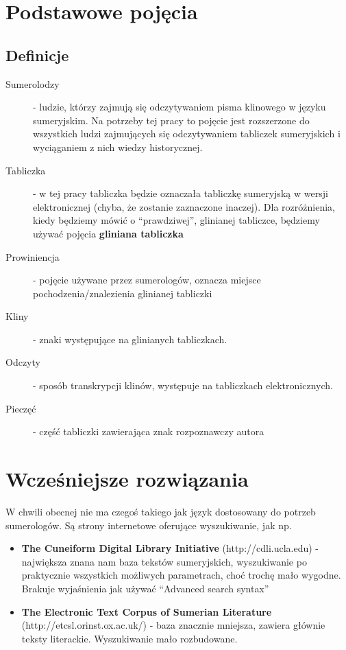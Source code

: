 \documentclass{pracamgr}
\begin{document}
\chapter{Podstawowe pojęcia}\label{r:pojecia}
\section{Definicje}
\begin{description}
 \item[Sumerolodzy] - ludzie, którzy zajmują się odczytywaniem pisma klinowego w języku sumeryjskim. Na potrzeby tej pracy
		      to pojęcie jest rozszerzone do wszystkich ludzi zajmujących się odczytywaniem tabliczek sumeryjskich 
		      i wyciąganiem z nich wiedzy historycznej.
 \item[Tabliczka] - w tej pracy tabliczka będzie oznaczała tabliczkę sumeryjską w wersji elektronicznej 
		  (chyba, że zostanie zaznaczone inaczej). Dla rozróżnienia, kiedy będziemy mówić o ``prawdziwej'', 
		  glinianej tabliczce, będziemy używać pojęcia \textbf{gliniana tabliczka}
 \item[Prowiniencja] - pojęcie używane przez sumerologów, oznacza miejsce pochodzenia/znalezienia glinianej tabliczki
 \item[Kliny] - znaki występujące na glinianych tabliczkach.
 \item[Odczyty] - sposób transkrypcji klinów, występuje na tabliczkach elektronicznych.
 \item[Pieczęć] - część tabliczki zawierająca znak rozpoznawczy autora
\end{description}




\chapter{Wcześniejsze rozwiązania}\label{r:losers}
W chwili obecnej nie ma czegoś takiego jak język dostosowany do potrzeb sumerologów. Są strony internetowe oferujące wyszukiwanie, 
jak np.
\begin{itemize}
\item \textbf{The Cuneiform Digital Library Initiative} (http://cdli.ucla.edu) - największa znana nam baza tekstów sumeryjskich, 
wyszukiwanie po praktycznie wszystkich możliwych parametrach, choć trochę mało wygodne. Brakuje wyjaśnienia jak 
używać ``Advanced search syntax''
\item \textbf{The Electronic Text Corpus of Sumerian Literature} (http://etcsl.orinst.ox.ac.uk/) - baza znacznie mniejsza, zawiera 
głównie teksty literackie. Wyszukiwanie mało rozbudowane.
\end{itemize}
\end{document}

